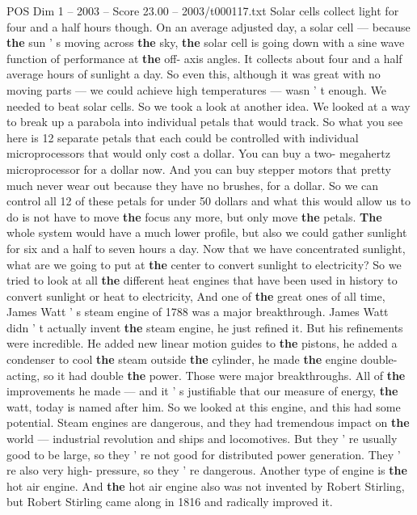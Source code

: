 \begin{textsample}{POS Dim 1 – 2003 – Score 23.00 – 2003/t000117.txt}
Solar cells collect light for four and a half hours though.
On an average adjusted day, a solar cell — because \textbf{the} sun ' s moving across \textbf{the} sky, \textbf{the} solar cell is going down with a sine wave function of performance at \textbf{the} off- axis angles.
It collects about four and a half average hours of sunlight a day.
So even this, although it was great with no moving parts — we could achieve high temperatures — wasn ' t enough.
We needed to beat solar cells.
So we took a look at another idea.
We looked at a way to break up a parabola into individual petals that would track.
So what you see here is 12 separate petals that each could be controlled with individual microprocessors that would only cost a dollar.
You can buy a two- megahertz microprocessor for a dollar now.
And you can buy stepper motors that pretty much never wear out because they have no brushes, for a dollar.
So we can control all 12 of these petals for under 50 dollars and what this would allow us to do is not have to move \textbf{the} focus any more, but only move \textbf{the} petals. \textbf{The} whole system would have a much lower profile, but also we could gather sunlight for six and a half to seven hours a day.
Now that we have concentrated sunlight, what are we going to put at \textbf{the} center to convert sunlight to electricity?
So we tried to look at all \textbf{the} different heat engines that have been used in history to convert sunlight or heat to electricity, And one of \textbf{the} great ones of all time, James Watt ' s steam engine of 1788 was a major breakthrough.
James Watt didn ' t actually invent \textbf{the} steam engine, he just refined it.
But his refinements were incredible.
He added new linear motion guides to \textbf{the} pistons, he added a condenser to cool \textbf{the} steam outside \textbf{the} cylinder, he made \textbf{the} engine double-acting, so it had double \textbf{the} power.
Those were major breakthroughs.
All of \textbf{the} improvements he made — and it ' s justifiable that our measure of energy, \textbf{the} watt, today is named after him.
So we looked at this engine, and this had some potential.
Steam engines are dangerous, and they had tremendous impact on \textbf{the} world — industrial revolution and ships and locomotives.
But they ' re usually good to be large, so they ' re not good for distributed power generation.
They ' re also very high- pressure, so they ' re dangerous.
Another type of engine is \textbf{the} hot air engine.
And \textbf{the} hot air engine also was not invented by Robert Stirling, but Robert Stirling came along in 1816 and radically improved it.

\end{textsample}
